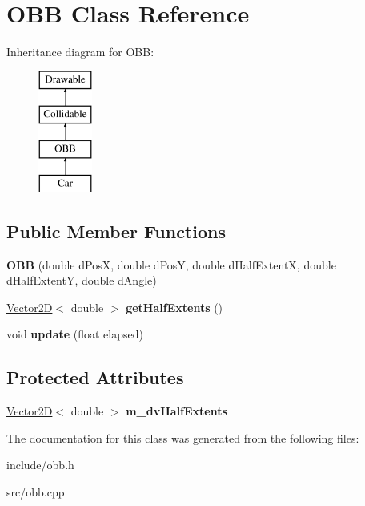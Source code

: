\hypertarget{class_o_b_b}{}\section{O\+B\+B Class Reference}
\label{class_o_b_b}
Inheritance diagram for O\+B\+B\+:\begin{figure}[H]
\begin{center}
\leavevmode
\includegraphics[height=4.000000cm]{class_o_b_b}
\end{center}
\end{figure}
\subsection*{Public Member Functions}
\begin{DoxyCompactItemize}
\item 
\hypertarget{class_o_b_b_ab736691f196da32e5d29b39cc5f797a9}{}{\bfseries O\+B\+B} (double d\+Pos\+X, double d\+Pos\+Y, double d\+Half\+Extent\+X, double d\+Half\+Extent\+Y, double d\+Angle)\label{class_o_b_b_ab736691f196da32e5d29b39cc5f797a9}

\item 
\hypertarget{class_o_b_b_acb95cc5ca2f703da43444f6a029d117b}{}\hyperlink{class_vector2_d}{Vector2\+D}$<$ double $>$ {\bfseries get\+Half\+Extents} ()\label{class_o_b_b_acb95cc5ca2f703da43444f6a029d117b}

\item 
\hypertarget{class_o_b_b_a6005b95cbc3dae148ebafa84bf4bc06f}{}void {\bfseries update} (float elapsed)\label{class_o_b_b_a6005b95cbc3dae148ebafa84bf4bc06f}

\end{DoxyCompactItemize}
\subsection*{Protected Attributes}
\begin{DoxyCompactItemize}
\item 
\hypertarget{class_o_b_b_a4e81d2a5c71b24ee0b52cc176f48f272}{}\hyperlink{class_vector2_d}{Vector2\+D}$<$ double $>$ {\bfseries m\+\_\+dv\+Half\+Extents}\label{class_o_b_b_a4e81d2a5c71b24ee0b52cc176f48f272}

\end{DoxyCompactItemize}


The documentation for this class was generated from the following files\+:\begin{DoxyCompactItemize}
\item 
include/obb.\+h\item 
src/obb.\+cpp\end{DoxyCompactItemize}
